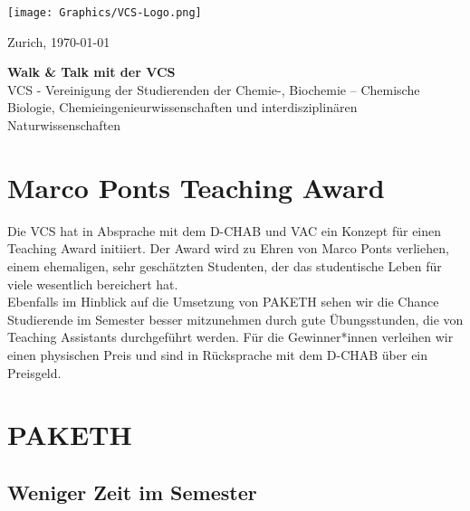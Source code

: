 \documentclass{article}
\begin{document}
\vspace{-4cm}
\texttt{[image: Graphics/VCS-Logo.png]}

\vspace{-1.5cm}
\begin{flushright}
\parbox[r]{5cm}{Zurich, \today}
\end{flushright}

\vspace{1.5cm}
\begin{center}
\textbf{\LARGE{Walk \& Talk mit der VCS}} \\
\vspace{0.5cm}
\Large
VCS - Vereinigung der Studierenden der Chemie-, Biochemie – Chemische Biologie, 
Chemieingenieurwissenschaften und interdisziplinären Naturwissenschaften
\end{center}

\section{Marco Ponts Teaching Award}
Die VCS hat in Absprache mit dem D-CHAB und VAC ein Konzept für einen Teaching Award initiiert. Der Award wird zu Ehren von Marco Ponts verliehen, einem ehemaligen, sehr geschätzten Studenten, der das studentische Leben für viele wesentlich bereichert hat. \\ 

Ebenfalls im Hinblick auf die Umsetzung von PAKETH sehen wir die Chance Studierende im Semester besser mitzunehmen durch gute Übungsstunden, die von Teaching Assistants durchgeführt werden. 
Für die Gewinner*innen verleihen wir einen physischen Preis und sind in Rücksprache mit dem D-CHAB über ein Preisgeld. 


\section{PAKETH}

\subsection{Weniger Zeit im Semester}
\end{document}

